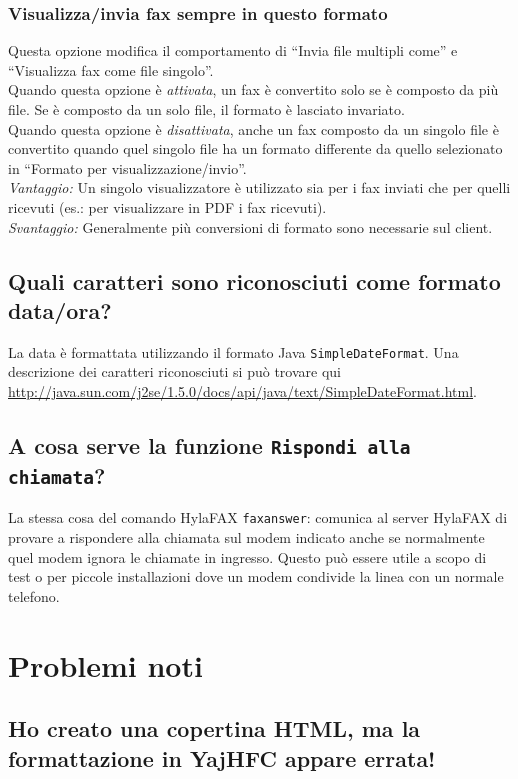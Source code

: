 \documentclass[a4paper,10pt]{scrartcl}
\begin{document}
\subsubsection{Visualizza/invia fax sempre in questo formato}
Questa opzione modifica il comportamento di ``Invia file multipli come'' e ``Visualizza fax come file singolo''.\\
Quando questa opzione è \textit{attivata}, un fax è convertito solo se è composto da più file. Se è composto da un solo file, il formato è lasciato invariato.\\
Quando questa opzione è \textit{disattivata}, anche un fax composto da un singolo file è convertito quando quel singolo file ha un formato differente da quello selezionato in ``Formato per visualizzazione/invio''.\\
\textit{Vantaggio:} Un singolo visualizzatore è utilizzato sia per i fax inviati che per quelli ricevuti (es.: per visualizzare in PDF i fax ricevuti).\\
\textit{Svantaggio:} Generalmente più conversioni di formato sono necessarie sul client.

\subsection{Quali caratteri sono riconosciuti come formato data/ora?}

La data è formattata utilizzando il formato Java \texttt{SimpleDateFormat}. Una descrizione dei caratteri riconosciuti si può trovare qui \url{http://java.sun.com/j2se/1.5.0/docs/api/java/text/SimpleDateFormat.html}.

\subsection{A cosa serve la funzione \texttt{Rispondi alla chiamata}?}

La stessa cosa del comando HylaFAX \verb#faxanswer#: comunica al server HylaFAX di provare a rispondere alla chiamata sul modem indicato anche se normalmente quel modem ignora le chiamate in ingresso. Questo può essere utile a scopo di test o per piccole installazioni dove un modem condivide la linea con un normale telefono.

\section{Problemi noti}

\subsection{Ho creato una copertina HTML, ma la formattazione in YajHFC appare errata!}
\end{document}
